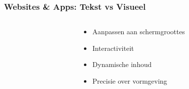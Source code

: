 \documentclass[presentatie.tex]{subfiles}
\begin{document}

    \begin{frame}
        \frametitle{Websites \& Apps: Tekst vs Visueel}
        \begin{columns}
            \begin{column}{0.6\textwidth}
                \vspace{10px}
                \unless\ifishandout
                \fi
            \end{column}
            \begin{column}{0.45\textwidth}
                \begin{itemize}
                    \item Aanpassen aan schermgroottes
                    \item Interactiviteit
                    \item Dynamische inhoud
                    \item Precisie over vormgeving
                \end{itemize}


\end{column}
\end{columns}
\end{frame}
\end{document}
